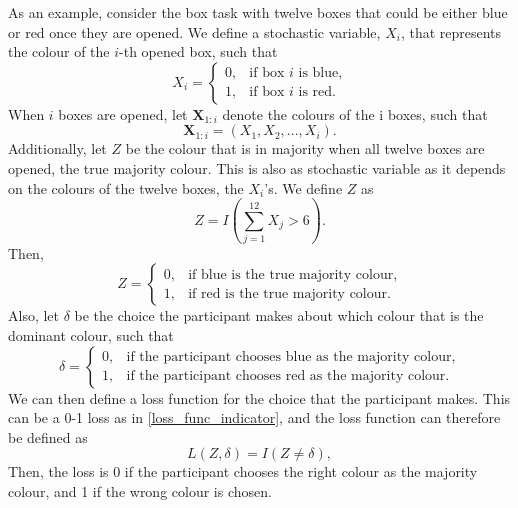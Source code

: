 As an example, consider the box task with twelve boxes that could be either blue or red once they are opened. We define a stochastic variable, $X_i$, that represents the colour of the $i$-th opened box, such that 
\begin{equation*}
    X_i =
    \begin{cases}
        0,& \text{if box }i \text{ is blue,}\\
        1,& \text{if box }i \text{ is red.}
    \end{cases}
\end{equation*}
When $i$ boxes are opened, let $\textbf{X}_{1:i}$ denote the colours of the i boxes, such that
\begin{equation*}
    \textbf{X}_{1:i} = (X_1,X_2,...,X_{i}).
\end{equation*}
Additionally, let $Z$ be the colour that is in majority when all twelve boxes are opened, the true majority colour. This is also as stochastic variable as it depends on the colours of the twelve boxes, the $X_i$'s. We define $Z$ as
\begin{equation}
\label{def_of_Z}
    Z = I\left(\sum_{j=1}^{12}X_j > 6\right).
\end{equation}
Then,
\begin{equation}
\label{Z_true_majority}
    Z = 
    \begin{cases}
        0,& \text{if blue is the true majority colour,} \\
        1,& \text{if red is the true majority colour.}
    \end{cases}
\end{equation}
Also, let $\delta$ be the choice the participant makes about which colour that is the dominant colour, such that
\begin{equation*}
    \delta = 
    \begin{cases}
        0,& \text{if the participant chooses blue as the majority colour,}\\
        1,& \text{if the participant chooses red as the majority colour}.
    \end{cases}
\end{equation*}
We can then define a loss function for the choice that the participant makes. This can be a 0-1 loss as in \eqref{loss_func_indicator}, and the loss function can therefore be defined as 
\begin{equation}
\label{loss_func_example}
    L(Z,\delta) = I(Z \neq \delta),
\end{equation}
Then, the loss is 0 if the participant chooses the right colour as the majority colour, and 1 if the wrong colour is chosen. 

